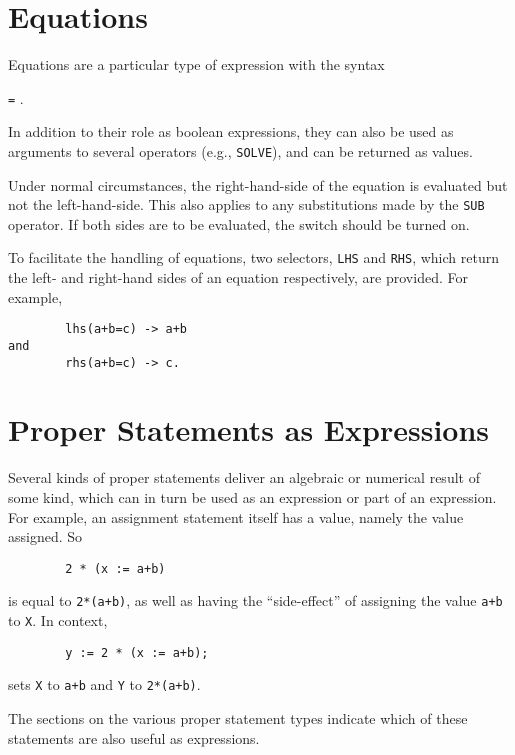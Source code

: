 \section{Equations}

Equations are a particular type of expression with the syntax
\begin{syntax}
       \texttt{=} .
\end{syntax}
In addition to their role as boolean expressions, they can also be used as
arguments to several operators (e.g., \texttt{SOLVE}), and can be
returned as values.

\hypertarget{switch:EVALLHSEQP}{}
Under normal circumstances, the right-hand-side of the equation is
evaluated but not the left-hand-side.  This also applies to any substitutions
made by the \texttt{SUB} operator.  If both sides are to be
evaluated, the switch  should be
turned on.

\hypertarget{operator:LHS}{}
\hypertarget{operator:RHS}{}
To facilitate the handling of equations, two selectors, \texttt{LHS}
 and \texttt{RHS}, which return the left- and
right-hand sides of an equation respectively, are provided.
For example,
\begin{verbatim}
        lhs(a+b=c) -> a+b
and
        rhs(a+b=c) -> c.
\end{verbatim}

\section{Proper Statements as Expressions}

Several kinds of proper statements deliver
an algebraic or numerical result of some kind, which can in turn be used as
an expression or part of an expression.  For example, an assignment
statement itself has a value, namely the value assigned.  So
\begin{verbatim}
        2 * (x := a+b)
\end{verbatim}
is equal to \texttt{2*(a+b)}, as well as having the ``side-effect'' of assigning the value \texttt{a+b} to \texttt{X}.  In context,
\begin{verbatim}
        y := 2 * (x := a+b);
\end{verbatim}
sets \texttt{X} to \texttt{a+b} and \texttt{Y} to \texttt{2*(a+b)}.

The sections on the various proper statement types
indicate which of these statements are also useful as expressions.

